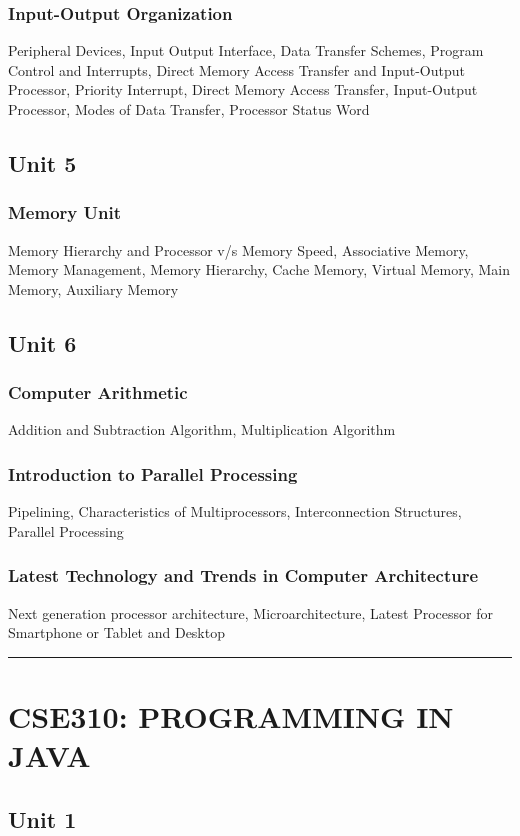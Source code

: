 \documentclass{article}
\begin{document}
\begin{multicols*}{2}
    \subsubsection*{Input-Output Organization}
    Peripheral Devices, Input Output Interface, Data Transfer Schemes, Program Control and Interrupts, Direct Memory Access Transfer and Input-Output Processor, Priority Interrupt, Direct Memory Access Transfer, Input-Output Processor, Modes of Data Transfer, Processor Status Word
    \subsection*{Unit 5}
    \subsubsection*{Memory Unit}
    Memory Hierarchy and Processor v/s Memory Speed, Associative Memory, Memory Management, Memory Hierarchy, Cache Memory, Virtual Memory, Main Memory, Auxiliary Memory
    \subsection*{Unit 6}
    \subsubsection*{Computer Arithmetic}
    Addition and Subtraction Algorithm, Multiplication Algorithm
    \subsubsection*{Introduction to Parallel Processing}
    Pipelining, Characteristics of Multiprocessors, Interconnection Structures, Parallel Processing
    \subsubsection*{Latest Technology and Trends in Computer Architecture}
    Next generation processor architecture, Microarchitecture, Latest Processor for Smartphone or Tablet and Desktop \\
    \hrule
    \section*{CSE310: PROGRAMMING IN JAVA }
    \subsection*{Unit 1}

\end{multicols*}
\end{document}
